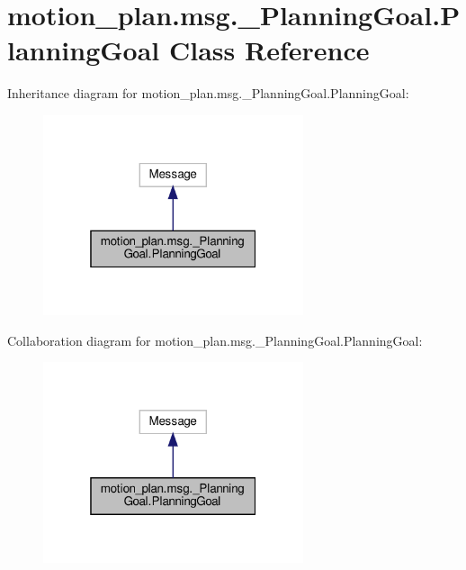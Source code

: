 \hypertarget{classmotion__plan_1_1msg_1_1__PlanningGoal_1_1PlanningGoal}{}\section{motion\+\_\+plan.\+msg.\+\_\+\+Planning\+Goal.\+Planning\+Goal Class Reference}
\label{classmotion__plan_1_1msg_1_1__PlanningGoal_1_1PlanningGoal}


Inheritance diagram for motion\+\_\+plan.\+msg.\+\_\+\+Planning\+Goal.\+Planning\+Goal\+:
\nopagebreak
\begin{figure}[H]
\begin{center}
\leavevmode
\includegraphics[width=217pt]{classmotion__plan_1_1msg_1_1__PlanningGoal_1_1PlanningGoal__inherit__graph}
\end{center}
\end{figure}


Collaboration diagram for motion\+\_\+plan.\+msg.\+\_\+\+Planning\+Goal.\+Planning\+Goal\+:
\nopagebreak
\begin{figure}[H]
\begin{center}
\leavevmode
\includegraphics[width=217pt]{classmotion__plan_1_1msg_1_1__PlanningGoal_1_1PlanningGoal__coll__graph}
\end{center}
\end{figure}
